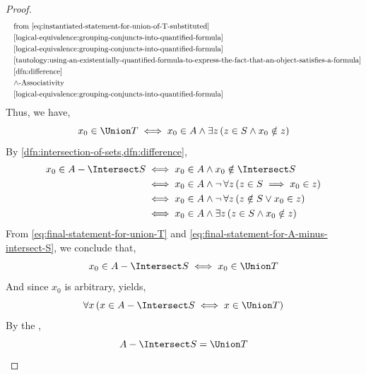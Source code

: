 \begin{proof}
\begin{equation*}
        \begin{aligned}
            &\quad \text{from \eqref{eq:instantiated-statement-for-union-of-T-substituted}}\\
            &\quad \text{\cref{logical-equivalence:grouping-conjuncts-into-quantified-formula}}\\
            &\quad \text{\cref{logical-equivalence:grouping-conjuncts-into-quantified-formula}}\\
            &\quad \text{\cref{tautology:using-an-existentially-quantified-formula-to-express-the-fact-that-an-object-satisfies-a-formula}}\\
            &\quad \text{\cref{dfn:difference}}\\
            &\quad \text{\( \land \)-Associativity}\\
            &\quad \text{\cref{logical-equivalence:grouping-conjuncts-into-quantified-formula}}\\
        \end{aligned}
    \end{equation*}
    Thus, we have,
    \begin{equation}
        \label{eq:final-statement-for-union-T}
        x_{0} \in \Union T
        \iff
        x_{0} \in A \land \exists z \, \mleft( z \in S \land x_{0} \notin z \mright)
    \end{equation}
    By \cref{dfn:intersection-of-sets,dfn:difference},
    \begin{align}
        \label{eq:final-statement-for-A-minus-intersect-S}
        x_{0} \in A - \Intersect S
        &\iff
        x_{0} \in A \land x_{0} \notin \Intersect S \notag \\
        &\iff
        x_{0} \in A \land \lnot \, \forall z \, \mleft( z \in S \implies x_{0} \in z \mright) \notag \\
        &\iff
        x_{0} \in A \land \lnot \, \forall z \, \mleft( z \notin S \lor x_{0} \in z \mright) \notag \\
        &\iff
        x_{0} \in A \land \exists z \, \mleft( z \in S \land x_{0} \notin z \mright)
    \end{align}
    From \eqref{eq:final-statement-for-union-T} and \eqref{eq:final-statement-for-A-minus-intersect-S}, we conclude that,
    \begin{equation*}
        x_{0} \in A - \Intersect S \iff x_{0} \in \Union T
    \end{equation*}
    And since \( x_{0} \) is arbitrary,  yields,
    \begin{equation*}
        \forall x \, \mleft( x \in A - \Intersect S \iff x \in \Union T \mright)
    \end{equation*}
    By the ,
    \begin{equation*}
        A - \Intersect S = \Union T \qedhere
    \end{equation*}
\end{proof}

